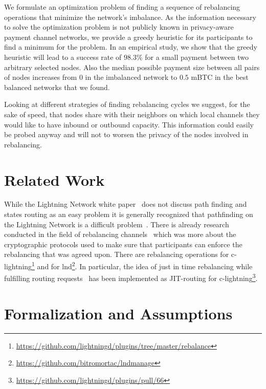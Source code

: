 \documentclass[conference]{IEEEtran}
\begin{document}
We formulate an optimization problem of finding a sequence of rebalancing operations that minimize the network's imbalance.
As the information necessary to solve the optimization problem is not publicly known in privacy-aware payment channel networks, we provide a greedy heuristic for its participants to find a minimum for the problem. 
In an empirical study, we show that the greedy heuristic will lead to a success rate of $98.3\%$ for a small payment between two arbitrary selected nodes.
Also the median possible payment size between all pairs of nodes increases from $0$ in the imbalanced network to $0.5$ mBTC in the best balanced networks that we found.

Looking at different strategies of finding rebalancing cycles we suggest, for the sake of speed, that nodes share with their neighbors on which local channels they would like to have inbound or outbound capacity.
This information could easily be probed anyway and will not to worsen the privacy of the nodes involved in rebalancing.

\section{Related Work}
\label{sec:relatedWork}

While the Lightning Network white paper~\cite{poon2016bitcoin} does not discuss path finding and states routing as an easy problem it is generally recognized that pathfinding on the Lightning Network is a difficult problem~\cite{piatkivskyi2018split, prihodko2016flare, bagaria2019boomerang, pickhardt2019pathfinding, grunspan2018ant, sivaraman2018routing}.
There is already research conducted in the field of rebalancing channels~\cite{khalil2017revive} which was more about the cryptographic protocols used to make sure that participants can enforce the rebalancing that was agreed upon.
There are rebalancing operations for c-lightning\footnote{\url{https://github.com/lightningd/plugins/tree/master/rebalance}} and for lnd\footnote{\url{https://github.com/bitromortac/lndmanage}}.
In particular, the idea of just in time rebalancing while fulfilling routing requests~\cite{pickhardt2019jit} has been implemented as JIT-routing for c-lightning\footnote{\url{https://github.com/lightningd/plugins/pull/66}}. 

\section{Formalization and Assumptions}
\label{sec:formalization}
\end{document}
